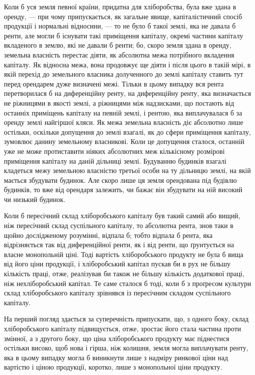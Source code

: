 
Коли б уся земля певної країни, придатна для хліборобства, була вже
здана в оренду, — при чому припускається, як загальне явище, капіталістичний
спосіб продукції і нормальні відносини, — то не було б такої землі, яка не
давала б ренти, але могли б існувати такі приміщення капіталу, окремі частини
капіталу вкладеного в землю, які не давали б ренти; бо, скоро земля здана в
оренду, земельна власність перестає діяти, як абсолютна межа потрібного вкладення
капіталу. Як відносна межа, вона продовжує ще діяти і після цього
в такій мірі, в якій перехід до земельного власника долученного до землі капіталу
ставить тут перед орендарем дуже визначені межі. Тільки в цьому випадку
вся рента перетворилася б на диференційну ренту, на диференційну ренту, яка
визначається не ріжницями в якості землі, а ріжницями між надзисками, що
постають від останніх приміщень капіталу на певній землі, і рентою, яка виплачувалася
б за оренду землі найгіршої кляси. Як межа земельна власність
діє абсолютно лише остільки, оскільки допущення до землі взагалі, як до сфери
приміщення капіталу, зумовлює данину земельному власникові. Коли це допущення
сталося, останній уже не може протиставити ніяких абсолютних меж
кількісному розмірові приміщення капіталу на даній дільниці землі. Будуванню
будинків взагалі кладеться межу земельною власністю третьої особи на ту дільницю
землі, на якій мається збудувати будинок. Але скоро лише ця земля
орендована під будівлю будинків, то вже від орендаря залежить, чи бажає він
збудувати на ній високий чи низький будинок.

Коли б пересічний склад хліборобського капіталу був такий самий або
вищий, ніж пересічний склад суспільного капіталу, то абсолютна рента, знов
таки в щойно дослідженому розумінні, відпала б; тобто відпала б рента, яка
відрізняється так від диференційної ренти, як і від ренти, що ґрунтується на
власне монопольній ціні. Тоді вартість хліборобського продукту не була б
вища від його ціни продукції, і хліборобський капітал пускав би в рух не
більшу кількість праці, отже, реалізував би також не більшу кількість додаткової
праці, ніж нехліборобський капітал. Те саме сталося б тоді, коли б з
проґресом культури склад хліборобського капіталу зрівнявся із пересічним
складом суспільного капіталу.

На перший погляд здається за суперечність припускати, що, з одного
боку, склад хліборобського капіталу підвищується, отже, зростає його стала частина
проти змінної, а з другого боку, що ціна хліборобського продукту має
піднестися остільки високо, щоб нова і гірша, ніж колишня, земля могла виплачувати
ренту, яка в цьому випадку могла б виникнути лише з надміру ринкової
ціни над вартістю і ціною продукції, коротко, лише з монопольної ціни
продукту.

